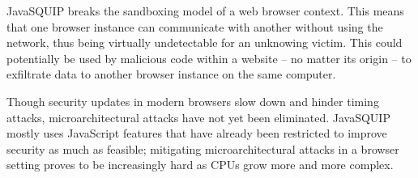 \documentclass[11pt,
  titlepage=false,
]{scrreprt}
\begin{document}
JavaSQUIP breaks the sandboxing model of a web browser context.
This means that one browser instance can communicate with another without using the network, thus being virtually undetectable for an unknowing victim.
This could potentially be used by malicious code within a website -- no matter its origin -- to exfiltrate data to another browser instance on the same computer.

Though security updates in modern browsers slow down and hinder timing attacks, microarchitectural attacks have not yet been eliminated.
JavaSQUIP mostly uses JavaScript features that have already been restricted to improve security as much as feasible;
mitigating microarchitectural attacks in a browser setting proves to be increasingly hard as CPUs grow more and more complex.



\printbibliography
\end{document}

